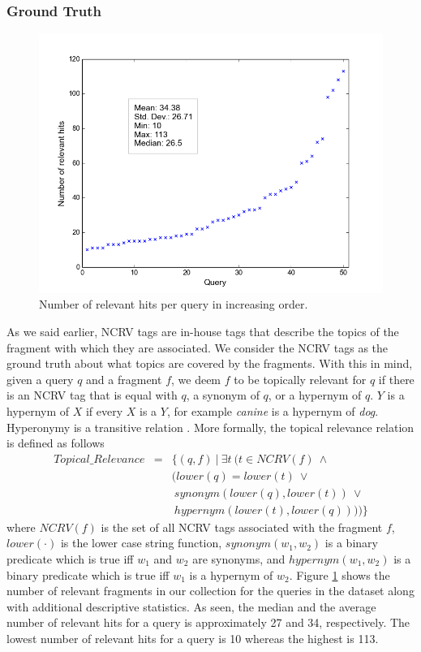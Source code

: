 \subsubsection{Ground Truth}\label{filter:ground-truth}

\begin{figure}
\centering
\includegraphics[scale=.4]{reljud.png}
\caption{Number of relevant hits per query in increasing order.}
\label{filter:fig:reljud}
\end{figure}
As we said earlier, %
NCRV tags are in-house tags that describe the topics of the fragment with which they are associated.
We consider the NCRV tags as the ground truth about what topics are covered by the fragments.
With this in mind, given a query $q$ and a fragment $f$, we deem $f$ to be topically relevant for $q$ if there is an NCRV tag that is equal with $q$, a synonym of $q$, or a hypernym of $q$. $Y$ is a hypernym of $X$ if every $X$ is a $Y$, for example \textit{canine} is a hypernym of \textit{dog}. Hyperonymy is a transitive relation \cite{wordnet}. More formally, the topical relevance relation is defined as follows
\begin{eqnarray}\label{ground_truth}
Topical\_Relevance &=& \{(q,f)~|~\exists t~(t \in NCRV(f)~\wedge \nonumber\\ 
				  &&(lower(q) = lower(t)~\vee \nonumber\\
				  &&~synonym(lower(q), lower(t))~\vee \nonumber\\
				  &&~hypernym(lower(t), lower(q))))\}
				  \label{top_rel_def}
\end{eqnarray}
where $NCRV(f)$ is the set of all NCRV tags associated with the fragment $f$, $lower(\cdot)$ is the lower case string function, $synonym(w_1, w_2)$ is a binary predicate which is true iff $w_1$ and $w_2$ are synonyms, and $hypernym(w_1, w_2)$ is a binary predicate which is true iff $w_1$ is a hypernym of $w_2$. Figure \ref{filter:fig:reljud} shows the number of relevant fragments in our collection for the queries in the dataset along with additional descriptive statistics. As seen, the median and the average number of relevant hits for a query is approximately 27 and 34, respectively. The lowest number of relevant hits for a query is 10 whereas the highest is 113.

